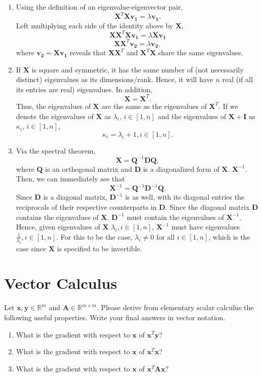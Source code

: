 \documentclass[submit]{harvardml}
\newcommand{\R}{\mathbb{R}}
\renewcommand{\v}[1]{\mathbf{#1}}
\begin{document}
\begin{enumerate}[label=(\alph*)]
    \item Using the definition of an eigenvalue-eigenvector pair,\[\v X^T \v X \v{v_1} = \lambda \v{v_1}.\] Left multiplying each side of the identity above by $\v X$,\[\v X \v X^T \v X \v{v_1} = \lambda \v X \v{v_1}\]\[\v X \v X^T \v{v_2} = \lambda \v{v_2},\] where $\v{v_2} = \v X \v{v_1}$ reveals that $\v X \v X^T$ and $\v X^T \v X$ share the same eigenvalues.
    
    \item If $\v X$ is square and symmetric, it has the same number of (not necessarily distinct) eigenvalues as its dimensions/rank. Hence, it will have $n$ real (if all its entries are real) eigenvalues. In addition,\[\v X = \v X^T.\] Thus, the eigenvalues of $\v X$ are the same as the eigenvalues of $\v X^T$. If we denote the eigenvalues of $\v X$ as $\lambda_i$, $i \in [1,n]$ and the eigenvalues of $\v X + \v I$ as $\kappa_i$, $i \in [1,n]$,\[\kappa_i = \lambda_i + 1, i \in [1,n].\]
    
    \item Via the spectral theorem,\[\v X = \v Q^{-1} \v D \v Q,\] where $\v Q$ is an orthogonal matrix and $\v D$ is a diagonalized form of $\v X$. $\v X^{-1}$. Then, we can immediately see that \[\v X^{-1} = \v Q^{-1} \v D^{-1} \v Q.\] Since $\v D$ is a diagonal matrix, $\v D^{-1}$ is as well, with its diagonal entries the reciprocals of their respective counterparts in $\v D$. Since the diagonal matrix $\v D$ contains the eigenvalues of $\v X$. $\v D^{-1}$ must contain the eigenvalues of $\v X^{-1}$. Hence, given eigenvalues of $\v X$ $\lambda_i, i \in [1,n]$, $\v X^{-1}$ must have eigenvalues $\frac{1}{\lambda_i}, i \in [1,n]$. For this to be the case, $\lambda_i \neq 0$ for all $i \in [1,n]$, which is the case since $\v X$ is specified to be invertible.
    
\end{enumerate}

\newpage
\section*{Vector Calculus}
\begin{problem}
  Let $\v x, \v y \in \R^m$ and $\v A \in \R^{m \times m}$. Please derive from
  elementary scalar calculus the following useful properties. Write
  your final answers in vector notation.
\begin{enumerate}[label=(\alph*)]
    \item What is the gradient with respect to $\v x$ of $\v x^T \v y$?
    \item What is the gradient with respect to $\v x$ of $\v x^T \v x$?
    \item What is the gradient with respect to $\v x$ of $\v x^T \v A \v x$?
\end{enumerate}
\end{problem}
\end{document}

